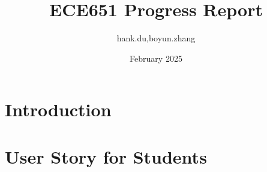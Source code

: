 \documentclass{article}
\title{ECE651 Progress Report}
\author{hank.du,boyun.zhang }
\date{February 2025}
\begin{document}
\maketitle

\section{Introduction}

\section{User Story for Students}
\end{document}
